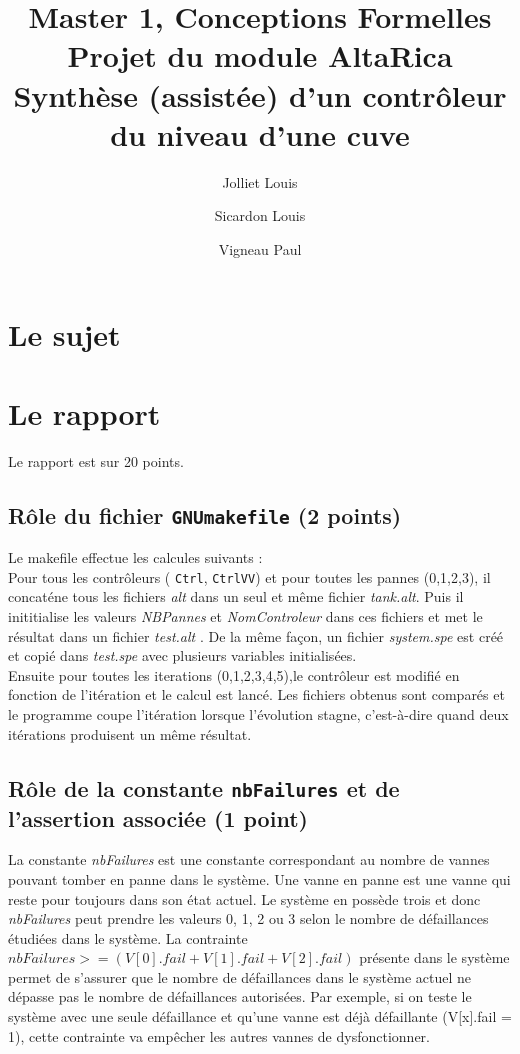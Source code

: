 \documentclass[a4paper]{book}
\newcommand{\altarica}{{\sc AltaRica}}
\begin{document}
\title{Master 1, Conceptions Formelles\\
Projet du module \altarica\\
Synthèse (assistée) d'un contrôleur du niveau d'une cuve}

\date{}

\author{Jolliet Louis \and Sicardon Louis \and Vigneau Paul}

\maketitle

\chapter{Le sujet}


\chapter{Le rapport}
Le rapport est sur 20 points.

\section{Rôle du fichier {\tt GNUmakefile} (2 points)}
Le makefile effectue les calcules suivants : \\
Pour tous les contrôleurs ( {\tt Ctrl}, {\tt CtrlVV}) et  pour toutes les pannes (0,1,2,3), il concaténe tous les fichiers \textit{alt} dans un seul et même fichier \textit{tank.alt}.
Puis il inititialise les valeurs \textit{NBPannes} et \textit{NomControleur} dans ces fichiers et met le résultat dans un fichier \textit{test.alt} .
De la même façon, un fichier  \textit{system.spe} est créé et copié dans  \textit{test.spe} avec plusieurs variables initialisées. \\
Ensuite pour toutes les iterations (0,1,2,3,4,5),le contrôleur est modifié en fonction de l'itération et le calcul est lancé.
Les fichiers obtenus sont comparés et le programme coupe l'itération lorsque l'évolution stagne, c'est-à-dire quand deux itérations produisent un même résultat.

\section{Rôle de la constante {\tt nbFailures} et de l'assertion associée (1 point)}
La constante \textit{nbFailures} est une constante correspondant au nombre de vannes pouvant tomber en panne dans le système. 
Une vanne en panne est une vanne qui reste pour toujours dans son état actuel. Le système en possède trois et donc \textit{nbFailures} 
peut prendre les valeurs 0, 1, 2 ou 3 selon le nombre de défaillances étudiées dans le système. La contrainte 
$nbFailures >= (V [0].fail + V [1].fail + V [2].fail)$ présente dans le système permet de s’assurer que le nombre de 
défaillances dans le système actuel ne dépasse pas le nombre de défaillances autorisées. Par exemple, si on teste le système 
avec une seule défaillance et qu'une vanne est déjà défaillante (V[x].fail = 1), cette contrainte va empêcher les autres vannes 
de dysfonctionner. 
\end{document}
